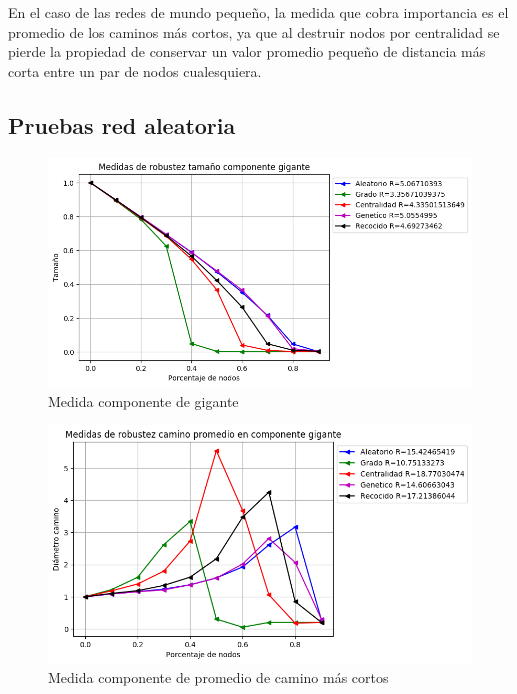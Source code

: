 En el caso de las redes de mundo pequeño, la medida que cobra importancia es el promedio de los caminos más cortos, ya que al destruir nodos por centralidad se pierde la propiedad de conservar un valor promedio pequeño de distancia más corta entre un par de nodos cualesquiera.


\subsection{Pruebas red aleatoria}


\begin{figure}[H]
    \centering
    \includegraphics[scale=0.7]{Capitulo5Robustez/imagenes/grafica_GC20180501_072543Random1991Nodes5939.png}
    \caption{Medida componente de gigante}
\end{figure}


\begin{figure}[H]
    \centering
    \includegraphics[scale=0.7]{Capitulo5Robustez/imagenes/grafica_APL20180501_072543Random1991Nodes5939.png}
    \caption{Medida componente de promedio de camino más cortos}
\end{figure}

